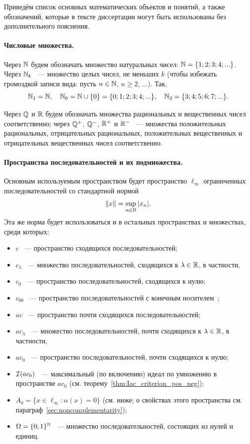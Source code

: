 Приведём список основных математических объектов и понятий,
а также обозначений, которые в тексте диссертации могут быть использованы без дополнительного пояснения.


\paragraph{Числовые множества.}
Через $\mathbb{N}$ будем обозначать множество натуральных чисел: $\mathbb{N} = \{1;2;3;4;...\}$.
Через $\mathbb{N}_k$ ~--- множество целых чисел, не меньших $k$ (чтобы избежать громоздкой записи вида: пусть $n\in \mathbb{N}$, $n \geq 2$, ...).
Так,
\begin{equation}
	\mathbb{N}_1 = \mathbb{N}
	,
	\quad
	\mathbb{N}_0 = \mathbb{N} \cup\{0\} = \{0;1;2;3;4;...\}
	,
	\quad
	\mathbb{N}_3 = \{3;4;5;6;7;...\}
	.
\end{equation}

Через $\mathbb{Q}$ и $\mathbb{R}$ будем обозначать множества рациональных и вещественных чисел соответственно;
через $\mathbb{Q}^+$, $\mathbb{Q}^-$, $\mathbb{R}^+$ и $\mathbb{R}^-$ ~--- множества положительных рациональных, отрицательных рациональных,
положительных вещественных и отрицательных вещественных чисел соответственно.

\paragraph{Пространства последовательностей и их подмножества.}

Основным используемым пространством будет пространство $\ell_\infty$ ограниченных последовательностей со стандартной нормой
\begin{equation}
	\|x\| = \sup_{n\in\mathbb{N}} |x_n|
	.
\end{equation}
Эта же норма будет использоваться и в остальных пространствах и множествах, среди которых:
\begin{itemize}
	\item
		$c$ ~--- пространство сходящихся последовательностей;
	\item
		$c_\lambda$ ~--- множество последовательностей, сходящихся к $\lambda \in \mathbb{R}$, в частности,
	\item
		$c_0$ ~--- пространство последовательностей, сходящихся к нулю;
	\item
		$c_{00}$ ~--- пространство последовательностей с конечным носителем~\cite[теорема 4]{ASSU2};
	\item
		$ac$ ~--- пространство почти сходящихся последовательностей;
	\item
		$ac_\lambda$ ~--- множество последовательностей, почти сходящихся к $\lambda \in \mathbb{R}$, в частности,
	\item
		$ac_0$ ~--- пространство последовательностей, почти сходящихся к нулю;
	\item
		$\mathcal{I}(ac_0)$ ~--- максимальный (по включению) идеал по умножению в пространстве $ac_0$ (см. теорему~\ref{thm:Iac_criterion_pos_neg});
	\item
		$A_0 = \{ x\in\ell_\infty : \alpha(x) = 0\}$ (см. ниже; о свойствах этого пространства см. параграф~\ref{sec:noncomplementarity});
	\item
		$\Omega = \{0;1\}^{\mathbb{N}}$ ~--- множество последовательностей, состоящих из нулей и единиц.
\end{itemize}



